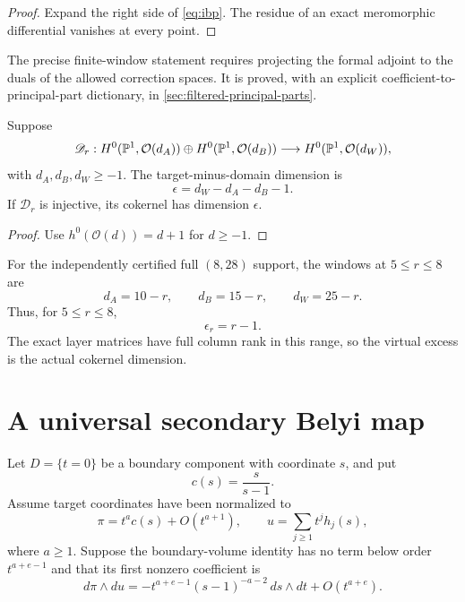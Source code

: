 \documentclass[11pt,reqno]{amsart}
\begin{document}
\begin{proof}
Expand the right side of \eqref{eq:ibp}.  The residue of an exact
meromorphic differential vanishes at every point.
\end{proof}

The precise finite-window statement requires projecting the formal adjoint
to the duals of the allowed correction spaces.  It is proved, with an
explicit coefficient-to-principal-part dictionary, in
\cref{sec:filtered-principal-parts}.

\begin{proposition}
\label{prop:index}
Suppose
\[
\mathscr D_r:
H^0(\mathbb P^1,\mathcal O(d_A))\oplus
H^0(\mathbb P^1,\mathcal O(d_B))
\longrightarrow
H^0(\mathbb P^1,\mathcal O(d_W)),
\]
with \(d_A,d_B,d_W\ge-1\).  The target-minus-domain dimension is
\begin{equation}
\label{eq:index}
\epsilon=d_W-d_A-d_B-1.
\end{equation}
If \(\mathscr D_r\) is injective, its cokernel has dimension \(\epsilon\).
\end{proposition}

\begin{proof}
Use \(h^0(\mathcal O(d))=d+1\) for \(d\ge-1\).
\end{proof}

For the independently certified full \((8,28)\) support, the windows at
\(5\le r\le8\) are
\[
d_A=10-r,\qquad d_B=15-r,\qquad d_W=25-r.
\]
Thus, for \(5\le r\le8\),
\[
\epsilon_r=r-1.
\]
The exact layer matrices have full column rank in this range, so the virtual
excess is the actual cokernel dimension.



\section{A universal secondary Belyi map}
\label{sec:secondary}

Let \(D=\{t=0\}\) be a boundary component with coordinate \(s\), and put
\[
c(s)=\frac{s}{s-1}.
\]
Assume target coordinates have been normalized to
\begin{equation}
\label{eq:contact}
\pi=t^ac(s)+O(t^{a+1}),\qquad
u=\sum_{j\ge1}t^jh_j(s),
\end{equation}
where \(a\ge1\).  Suppose the boundary-volume identity has no term below
order \(t^{a+e-1}\) and that its first nonzero coefficient is
\begin{equation}
\label{eq:volume}
d\pi\wedge du
=-t^{a+e-1}(s-1)^{-a-2}\,ds\wedge dt
+O(t^{a+e}).
\end{equation}
\end{document}
